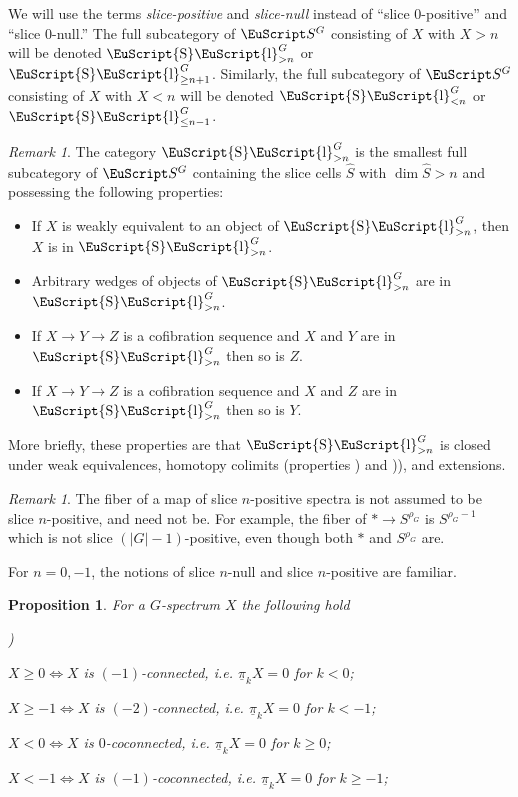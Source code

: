 \documentclass{amsart}
\newtheorem{prop}[equation]{Proposition}
\newtheorem{rem}[equation]{Remark}
\theoremstyle{definition}
\theoremstyle{remark}
\newtheorem{rem}[equation]{Remark}
\newcounter{thmItem}
\newcommand{\thmListItem}[1]{\rm \romannumeral#1)}
\newenvironment{thmList}{\begin{list}%
{\rm \roman{thmItem})}{\usecounter{thmItem}
\setlength{\labelwidth}{2em}
\setlength{\itemindent}{2em}
\setlength{\leftmargin}{0pt}
\setlength{\listparindent}{0pt}
\setlength{\parsep}{0pt}
\setlength{\partopsep}{0pt}
\setlength{\itemsep}{\medskipamount}
\setlength{\topsep}{\medskipamount}
}}{\end{list}}
\newcommand{\spectra}{\EuScript S}
\DeclareMathOperator{\slicesymbol}{\EuScript{S}\EuScript{l}}
\newcommand{\gslice}[1]{\slicesymbol^{G}_{>{#1}}}
\newcommand{\geslice}[1]{\slicesymbol^{G}_{\ge{#1}}}
\newcommand{\lslice}[2]{\slicesymbol^{#1}_{<{#2}}}
\newcommand{\leslice}[2]{\slicesymbol^{#1}_{\le{#2}}}
\newcommand{\pim}{\underline{\pi}}
\newcommand{\ugspectra}[1]{\spectra^{#1}}
\newcommand{\slicecell}{\widehat{S}}
\begin{document}
We will use the terms {\em slice-positive} and {\em slice-null}
instead of ``slice $0$-positive'' and ``slice $0$-null.''  The full
subcategory of $\ugspectra{G}$ consisting of $X$ with $X> n$ will be
denoted $\gslice{n}$ or $\geslice{n+1}$.  Similarly, the full
subcategory of $\ugspectra{G}$ consisting of $X$ with $X < n$ will be
denoted $\lslice{G}{n}$ or $\leslice{G}{n-1}$.

\begin{rem}
\label{rem:23}
The category $\gslice{n}$ is the smallest full subcategory of
$\ugspectra{G}$ containing the slice cells $\slicecell$ with
$\dim\slicecell> n$ and possessing the following properties:
\begin{itemize}
\item [i)] If $X$ is weakly equivalent to an object of
$\gslice{n}$, then $X$ is in $\gslice{n}$.
\item [ii)] Arbitrary wedges of objects of $\gslice{n}$ are in
$\gslice{n}$.
\item [iii)]  If $X\to Y\to Z$ is a cofibration sequence and $X$ and
$Y$ are in $\gslice{n}$ then so is $Z$.
\item [iv)] If $X\to Y\to Z$ is a cofibration sequence and $X$ and
$Z$ are in $\gslice{n}$ then so is $Y$.
\end{itemize}
More briefly, these properties are that $\gslice{n}$ is closed under
weak equivalences, homotopy colimits (properties \thmListItem{2} and
\thmListItem{3}), and extensions.    
\end{rem}

\begin{rem}
\label{rem:76} 
The fiber of a map of slice $n$-positive spectra is not
assumed to be slice $n$-positive, and need not be.  For example, the
fiber of $\ast \to S^{\rho_{G}}$ is $S^{\rho_{G}-1}$ which is not
slice $(|G|-1)$-positive, even though both $\ast$ and $S^{\rho_{G}}$
are.
\end{rem}


For $n=0,-1$, the notions of slice $n$-null and slice $n$-positive are
familiar.

\begin{prop}
\label{thm:65}
For a $G$-spectrum $X$ the following hold
\begin{thmList}
\item $X\ge 0 \iff X$ is $(-1)$-connected, i.e. $\pim_{k} X= 0$ for $k< 0$;
\item $X\ge -1 \iff X$ is $(-2)$-connected, i.e. $\pim_{k} X= 0$ for $k<-1$;
\item $X < 0 \iff X$ is $0$-coconnected, i.e.  $\pim_{k} X= 0$ for $k\ge 0$;
\item $X < -1 \iff X$ is $(-1)$-coconnected, i.e.  $\pim_{k} X= 0$ for $k\ge -1$;
\end{thmList}
\end{prop}
\end{document}
